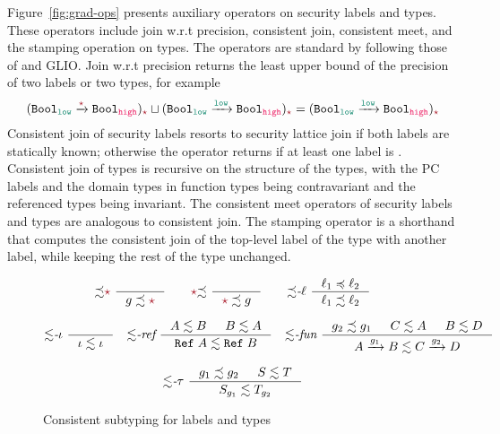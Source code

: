 Figure~\ref{fig:grad-ops} presents auxiliary operators on security labels and
types. These operators include join w.r.t precision, consistent join, consistent
meet, and the stamping operation on types. The operators are standard by following
those of \GSLRef and GLIO. Join w.r.t precision returns the least upper bound of
the precision of two labels or two types, for example
\[
(\Fun{\Bool_{\low}}{\unk}{\Bool_{\high}})_{\unk} \sqcup
(\Fun{\Bool_{\low}}{\low}{\Bool_{\high}})_{\unk} =
(\Fun{\Bool_{\low}}{\low}{\Bool_{\high}})_{\unk}
\]
Consistent join of security labels resorts to security lattice join if both
labels are statically known; otherwise the operator returns \unk if at least one
label is \unk. Consistent join of types is recursive on the structure of the
types, with the PC labels and the domain types in function types being
contravariant and the referenced types being invariant. The consistent meet
operators of security labels and types are analogous to consistent join. The
stamping operator is a shorthand that computes the consistent join of the
top-level label of the type with another label, while keeping the rest of the
type unchanged.

\begin{figure}[ht]
  \raggedright
  \begin{gather*}
    {\precsim}\unk~
    \inference{}{g \precsim \unk}
    \qquad
    \unk{\precsim}~
    \inference{}{\unk \precsim g}
    \qquad
        {\precsim}\textit{-}\ell~
        \inference{\ell_1 \preccurlyeq \ell_2}{\ell_1 \precsim \ell_2}
  \end{gather*}
  \raggedright
  \begin{gather*}
          {\lesssim}\textit{-}\iota~
          \inference{}{\iota \lesssim \iota}
          \quad
              {\lesssim}\textit{-ref}~
              \inference{A \lesssim B & B \lesssim A}{\Refer{A} \lesssim \Refer{B}} \quad
                        {\lesssim}\textit{-fun}~
                        \inference{g_2 \precsim g_1 & C \lesssim A & B \lesssim D}
                                  {\Fun{A}{g_1}{B} \lesssim \Fun{C}{g_2}{D}}
  \end{gather*}
  \raggedright
  \begin{gather*}
    {\lesssim}\textit{-}\tau~
    \inference{g_1 \precsim g_2 & S \lesssim T}{S_{g_1} \lesssim T_{g_2}}
  \end{gather*}
  \caption{Consistent subtyping for labels and types}
  \label{fig:consis-sub}
\end{figure}


